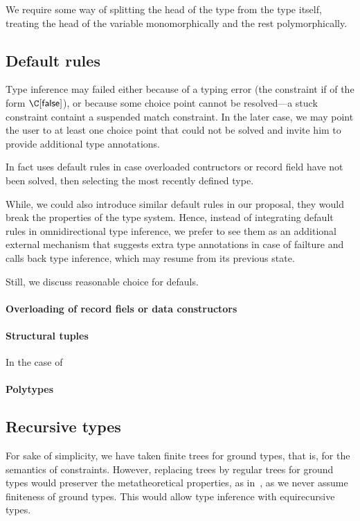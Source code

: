 \documentclass[acmsmall,screen,nonacm]{acmart}
\begin{document}
We require some way of splitting the head of the type from the type itself,
treating the head of the variable monomorphically and the rest
polymorphically.

\subsection{Default rules}

Type inference may failed either because of a typing error (the constraint
if of the form $\C \where \cfalse$), or because some choice point cannot be
resolved---a stuck constraint containt a suspended match constraint.
%
In the later case, we may point the user to at least one choice point that
could not be solved and invite him to provide additional type annotations.

In fact \OCaml uses default rules in case overloaded contructors or record
field have not been solved, then selecting the most recently defined type.

While, we could also introduce similar default rules in our proposal, they
would break the properties of the type system.  Hence, instead of
integrating default rules in omnidirectional type inference, we prefer to
see them as an additional external mechanism that suggests extra type
annotations in case of failture and calls back type inference, which may
resume from its previous state.

Still, we discuss reasonable choice for defauls.

\paragraph{Overloading of record fiels or data constructors}

\paragraph{Structural tuples}
In the case of

\paragraph{Polytypes}


\subsection{Recursive types}
\label {sec/rec-types}

For sake of simplicity, we have taken finite trees for ground types, that
is, for the semantics of constraints. However, replacing trees by regular
trees for ground types would preserver the metatheoretical properties, as
in~\cite {Pottier-Remy/emlti}, as we never assume finiteness of ground
types.  This would allow type inference with equirecursive types.
\end{document}
